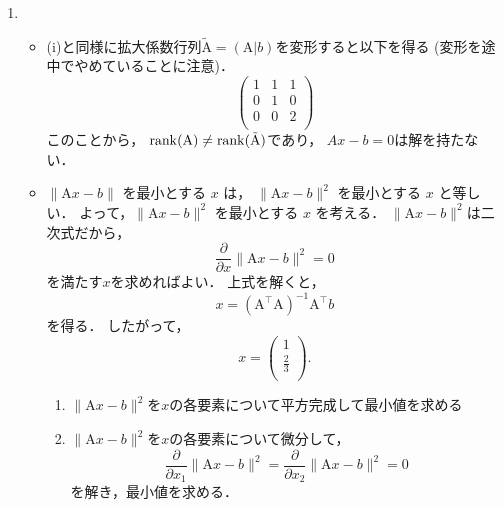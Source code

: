 \begin{enumerate}[label=問\arabic*.]
\begin{enumerate}[label=(\roman*)]
    \item
    \begin{itemize}
      \item (i)と同様に拡大係数行列$\tilde{\mathrm{A}} = (\mathrm{A}|b)$を変形すると以下を得る
        (変形を途中でやめていることに注意)．
        \begin{equation}
          \left(
            \begin{array}{rr|r}
              1 & 1 & 1 \\
              0 & 1 & 0 \\
              0 & 0 & 2 \\
            \end{array}
          \right)
        \end{equation}
        このことから，
        $\operatorname{rank}(\mathrm{A}) \neq \operatorname{rank}(\tilde{\mathrm{A}})$であり，
        $Ax - b = 0$は解を持たない．
      \item $\|\mathrm{A}x-b\|$ を最小とする $x$ は，
      $\|\mathrm{A}x-b\|^2$ を最小とする $x$ と等しい．
      よって，$\|\mathrm{A}x-b\|^2$ を最小とする $x$ を考える．
      $\|\mathrm{A}x-b\|^2$は二次式だから，
      \begin{equation}
        \frac{\partial}{\partial x} \| \mathrm{A}x-b \|^2 = 0
      \end{equation}
      を満たす$x$を求めればよい．
      上式を解くと，
      \begin{equation}
        x = (\mathrm{A}^\top \mathrm{A})^{-1} \mathrm{A}^\top b
      \end{equation}
      を得る．
      したがって，
      \begin{equation}
        x = \left(
          \begin{array}{r}
             1 \\
             \frac{2}{3} \\
          \end{array}
          \right).
      \end{equation}
      \begin{enumerate}[label=別解\arabic*]
        \item $\|\mathrm{A}x-b\|^2$を$x$の各要素について平方完成して最小値を求める
        \item $\|\mathrm{A}x-b\|^2$を$x$の各要素について微分して，
          \begin{equation}
            \frac{\partial}{\partial x_1} \| \mathrm{A}x-b \|^2
            = \frac{\partial}{\partial x_2} \| \mathrm{A}x-b \|^2 = 0
          \end{equation}
          を解き，最小値を求める．
      \end{enumerate}
    \end{itemize}


\end{enumerate}
\end{enumerate}
